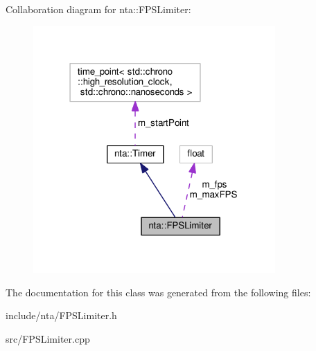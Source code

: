 Collaboration diagram for nta\+:\+:F\+P\+S\+Limiter\+:
\nopagebreak
\begin{figure}[H]
\begin{center}
\leavevmode
\includegraphics[width=262pt]{de/da2/classnta_1_1FPSLimiter__coll__graph}
\end{center}
\end{figure}


The documentation for this class was generated from the following files\+:\begin{DoxyCompactItemize}
\item 
include/nta/F\+P\+S\+Limiter.\+h\item 
src/F\+P\+S\+Limiter.\+cpp\end{DoxyCompactItemize}

